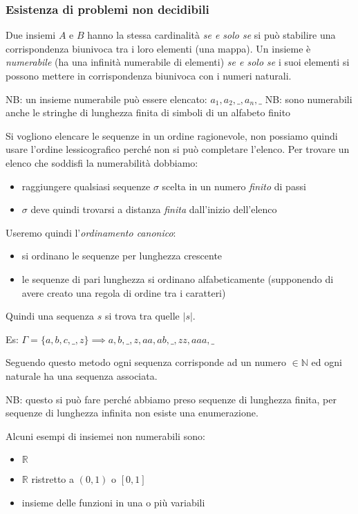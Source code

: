 \subsubsection{Esistenza di problemi non decidibili}
Due insiemi $A$ e $B$ hanno la stessa cardinalità \emph{se e solo se} si può stabilire una corrispondenza biunivoca tra i loro elementi (una mappa).
Un insieme è \emph{numerabile} (ha una infinità numerabile di elementi) \emph{se e solo se} i suoi elementi si possono mettere in corrispondenza biunivoca con i numeri naturali.

NB: un insieme numerabile può essere elencato: $a_1, a_2, \_, a_n, \_ $
NB: sono numerabili anche le stringhe di lunghezza finita di simboli di un alfabeto finito

Si vogliono elencare le sequenze in un ordine ragionevole, non possiamo quindi usare l'ordine lessicografico perché non si può completare l'elenco. Per trovare un elenco che soddisfi la numerabilità dobbiamo:
\begin{itemize}
    \item raggiungere qualsiasi sequenze $\sigma$ scelta in un numero \emph{finito} di passi
    \item $\sigma$ deve quindi trovarsi a distanza \emph{finita} dall'inizio dell'elenco
\end{itemize}

Useremo quindi l'\emph{ordinamento canonico}:
\begin{itemize}
    \item si ordinano le sequenze per lunghezza crescente
    \item le sequenze di pari lunghezza si ordinano alfabeticamente (supponendo di avere creato una regola di ordine tra i caratteri)
\end{itemize}

Quindi una sequenza $s$ si trova tra quelle $|s|$.

Es: $\Gamma = \{ a, b, c, \_, z \} \implies a, b, \_, z, aa, ab, \_, zz, aaa, \_ $

Seguendo questo metodo ogni sequenza corrisponde ad un numero $\in \mathbb{N}$ ed ogni naturale ha una sequenza associata.

NB: questo si può fare perché abbiamo preso sequenze di lunghezza finita, per sequenze di lunghezza infinita non esiste una enumerazione.

Alcuni esempi di insiemei non numerabili sono:
\begin{itemize}
    \item $\mathbb{R}$
    \item $\mathbb{R}$ ristretto a $(0, 1)$ o $[0, 1]$
    \item insieme delle funzioni in una o più variabili
\end{itemize}

